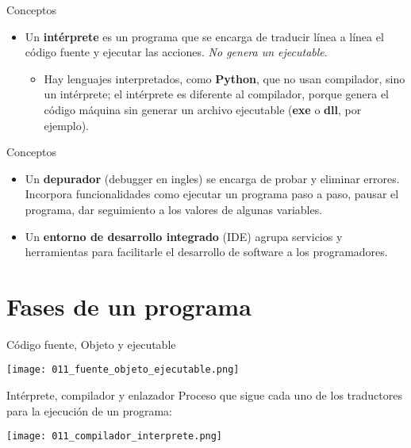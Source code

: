 \begin{frame}[c]{Conceptos}
  \begin{itemize}
    \item Un \textbf{intérprete} es un programa que se encarga de traducir
      línea a línea el código fuente y ejecutar las acciones. \emph{No genera
      un ejecutable}.
      \begin{itemize}
        \item Hay lenguajes interpretados, como \textbf{Python}, que no usan
          compilador, sino un intérprete; el intérprete es diferente al
          compilador, porque genera el código máquina sin generar un archivo
          ejecutable (\textbf{exe} o \textbf{dll}, por ejemplo).
      \end{itemize}
  \end{itemize}
\end{frame}

\begin{frame}[c]{Conceptos}
  \begin{itemize}
    \item Un \textbf{depurador} (debugger en ingles) se encarga de probar y
      eliminar errores. Incorpora funcionalidades como ejecutar un programa
      paso a paso, pausar el programa, dar seguimiento a los valores de
      algunas variables.
    \pausa
    \item Un \textbf{entorno de desarrollo integrado} (IDE) agrupa servicios y
      herramientas para facilitarle el desarrollo de software a los
      programadores.
  \end{itemize}
\end{frame}

\section{Fases de un programa}

\begin{frame}[c]{Código fuente, Objeto y ejecutable}
  \begin{center}
    \texttt{[image: 011\_fuente\_objeto\_ejecutable.png]}
  \end{center}
\end{frame}

\begin{frame}[c]{Intérprete, compilador y enlazador}
  Proceso que sigue cada uno de los traductores para la ejecución de un
  programa:
  \begin{center}
    \texttt{[image: 011\_compilador\_interprete.png]}
  \end{center}
\end{frame}

